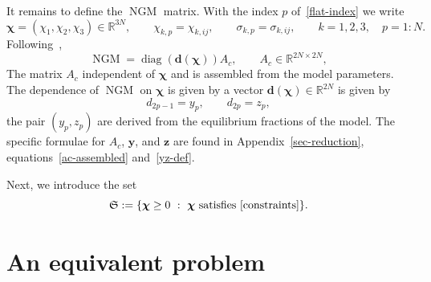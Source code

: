 \documentclass[11pt]{article}
\theoremstyle{plain}
\theoremstyle{definition}
\theoremstyle{remark}
\numberwithin{equation}{section}
\numberwithin{figure}{section}
\numberwithin{table}{section}
\begin{document}
It remains to define the $\operatorname{NGM}$ matrix.
With the index $p$ of~\eqref{flat-index} we write
\begin{equation}\label{flat}
\bm\chi=(\chi_1,\chi_2,\chi_3)\in\mathbb{R}^{3N},\qquad \chi_{k,p}=\chi_{k,ij},\qquad
\sigma_{k,p}=\sigma_{k,ij},\qquad k=1,2,3,\quad p=1:N .
\end{equation}
Following~\cite{JZh},
\begin{equation}\label{ngm}
\operatorname{NGM}=\operatorname{diag}\left(\bm d(\bm\chi)\right)A_c,
\qquad A_c\in\mathbb{R}^{2N\times 2N},
\end{equation}
The matrix $A_c$ independent of $\bm\chi$ and is assembled from the model parameters.
The dependence of $\operatorname{NGM}$ on $\bm\chi$ is given by a vector
$\bm d(\bm\chi)\in\mathbb{R}^{2N}$ is given by
\begin{equation}\label{yz}
d_{2p-1}=y_p,\qquad d_{2p}=z_p,
\end{equation}
the pair $(y_p,z_p)$ are derived from the equilibrium fractions of the model.
The specific formulae for $A_c$, $\bm y$, and $\bm z$ are found in
Appendix~\ref{sec-reduction}, equations~\eqref{ac-assembled} and~\eqref{yz-def}.

Next, we introduce the set 
\begin{equation}
    \mathfrak{S}:=\{\bm\chi\ge 0\ :\ \bm\chi\text{ satisfies~\eqref{constraints}}\}.
\end{equation}

\section{An equivalent problem}\label{sec-reduced}
\end{document}
